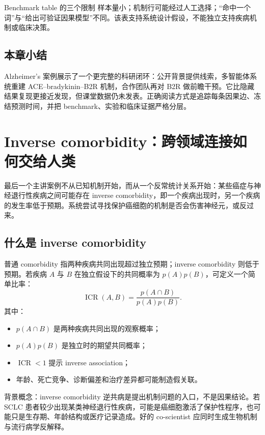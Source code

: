 \documentclass[a4paper]{article}
\begin{document}
\begin{warningbox}{Benchmark table 的三个限制}
样本量小；机制行可能经过人工选择；“命中一个词”与“给出可验证因果模型”不同。该表支持系统设计假设，不能独立支持疾病机制或临床决策。
\end{warningbox}

\subsection{本章小结}

Alzheimer's 案例展示了一个更完整的科研闭环：公开背景提供线索，多智能体系统重建 ACE--bradykinin--B2R 机制，合作团队再对 B2R 做前瞻干预。它比隐藏结果复现更接近发现，但课堂数据仍未发表。正确阅读方式是追踪每条因果边、冻结预测时间，并把 benchmark、实验和临床证据严格分层。

\section{Inverse comorbidity：跨领域连接如何交给人类}

最后一个主讲案例不从已知机制开始，而从一个反常统计关系开始：某些癌症与神经退行性疾病之间可能存在 inverse comorbidity，即一个疾病出现时，另一个疾病的发生率低于预期。系统尝试寻找保护癌细胞的机制是否会伤害神经元，或反过来。

\subsection{什么是 inverse comorbidity}

普通 comorbidity 指两种疾病共同出现超过独立预期；inverse comorbidity 则低于预期。若疾病 $A$ 与 $B$ 在独立假设下的共同概率为 $p(A)p(B)$，可定义一个简单比率：
$$
\operatorname{ICR}(A,B)=\frac{p(A\cap B)}{p(A)p(B)}.
$$
其中：
\begin{itemize}
  \item $p(A\cap B)$ 是两种疾病共同出现的观察概率；
  \item $p(A)p(B)$ 是独立时的期望共同概率；
  \item $\operatorname{ICR}<1$ 提示 inverse association；
  \item 年龄、死亡竞争、诊断偏差和治疗差异都可能制造假关联。
\end{itemize}

\begin{knowledgebox}{背景概念：inverse comorbidity}
逆共病是提出机制问题的入口，不是因果结论。若 SCLC 患者较少出现某类神经退行性疾病，可能是癌细胞激活了保护性程序，也可能只是生存期、年龄结构或医疗记录造成。好的 co-scientist 应同时生成生物机制与流行病学反解释。
\end{knowledgebox}
\end{document}
